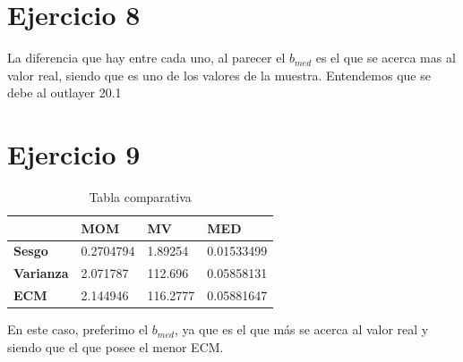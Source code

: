 \documentclass{article}
\begin{document}
\section{Ejercicio 8}
La diferencia que hay entre cada uno, al parecer el $b_{med}$ es el que se acerca mas al valor real, siendo que es uno de los valores de la muestra. Entendemos que se debe al outlayer 20.1

\newpage

\section{Ejercicio 9}
\newline

\begin{table}[h!]
\centering
\caption{Tabla comparativa}
\label{my-label}
\begin{tabular}{llll}
\hline
\multicolumn{1}{|l|}{}                  & \multicolumn{1}{l|}{\textbf{MOM}} & \multicolumn{1}{l|}{\textbf{MV}} & \multicolumn{1}{l|}{\textbf{MED}} \\ \hline
\multicolumn{1}{|l|}{\textbf{Sesgo}}    & \multicolumn{1}{l|}{0.2704794}   & \multicolumn{1}{l|}{1.89254}   & \multicolumn{1}{l|}{0.01533499}    \\ \hline
\multicolumn{1}{|l|}{\textbf{Varianza}} & \multicolumn{1}{l|}{2.071787}     & \multicolumn{1}{l|}{112.696}    & \multicolumn{1}{l|}{0.05858131}   \\ \hline
\multicolumn{1}{|l|}{\textbf{ECM}}      & \multicolumn{1}{l|}{2.144946}     & \multicolumn{1}{l|}{116.2777}    & \multicolumn{1}{l|}{0.05881647}    \\ \hline

\end{tabular}
\end{table}

En este caso, preferimo el $b_{med}$, ya que es el que más se acerca al valor real y siendo que el que posee el menor ECM.
\end{document}
